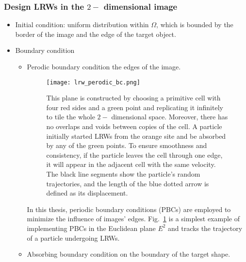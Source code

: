      \subsubsection{Design LRWs in the $2-$ dimensional image}
       \begin{itemize}
           \item Initial condition: uniform distribution within $\Omega$, which is bounded by the border of the image and the edge of the target object.
           \item Boundary condition
             \begin{itemize}
               \item Perodic boundary condition the edges of the image.
               \par

               
                 \begin{figure}
                   \centering
                   \texttt{[image: lrw\_perodic\_bc.png]}
                   \caption{This plane is constructed by choosing a
                     primitive cell with four red sides and a green
                     point and replicating it infinitely to tile the
                     whole $2-$ dimensional space. Moreover, there has
                     no overlaps and voids between copies of the
                     cell. A particle initially started LRWs from the
                     orange site and be absorbed by any of the green
                     points.  To ensure smoothness and consistency, if
                     the particle leaves the cell through one edge, it
                     will appear in the adjacent cell with the same
                     velocity. The black line segments show the
                     particle's random trajectories, and the length of
                     the blue dotted arrow is defined as its
                     displacement.}
                   \label{fig:pbc_lrws}
                 \end{figure}


                 In this thesis, periodic boundary conditions (PBCs)
                 are employed to minimize the influence of images'
                 edges. Fig.~\ref{fig:pbc_lrws} is a simplest example
                 of implementing PBCs in the Euclidean plane $E^2$ and
                 tracks the trajectory of a particle undergoing LRWs.


               
               \item Absorbing boundary condition on the boundary of the target shape.
             \end{itemize}
       \end{itemize}
       
